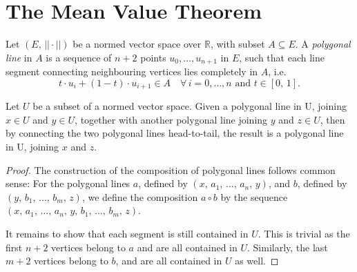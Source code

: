 %

\section{The Mean Value Theorem}

\begin{definition}
    \label{def:polygonalLine}
    \leanok
    Let $(E, \, ||\cdot||)$ be a normed vector space over $\mathbb{R}$, with subset $A \subseteq E$.
    A \emph{polygonal line} in $A$ is a sequence of $n + 2$ points $u_{0}, \dots, u_{n+1}$ in $E$,
    such that each line segment connecting neighbouring vertices lies completely in $A$, i.e.
    \[
        t \cdot u_{i} + (1 - t) \cdot u_{i + 1} \in A \quad \forall \, i = 0, \ldots, n
        \text{ and } t \in [0,\, 1].
    \]
\end{definition}

\begin{lemma}
    \label{lem:composition_of_polygonal_line}
    \leanok
    Let $U$ be a subset of a normed vector space.
    Given a polygonal line in U, joining $x \in U$ and $y \in U$, together with another polygonal line joining $y$ and $z \in U$,
    then by connecting the two polygonal lines head-to-tail, the result is a polygonal line in U, joining $x$ and $z$.
\end{lemma}
\begin{proof}
    \leanok
    The construction of the composition of polygonal lines follows common sense:
    For the polygonal lines $a$, defined by $(x,\, a_1,\, \dots,\, a_n,\,y)$,
    and $b$, defined by $(y,\, b_1,\, \dots,\, b_m,\, z)$,
    we define the composition $a \circ b$ by the sequence $(x,\,a_1,\,\dots,\, a_n,\,y,\,b_1,\,\dots,\,b_m,\,z)$.

    It remains to show that each segment is still contained in $U$.
    This is trivial as the first $n + 2$ vertices belong to $a$ and are all contained in $U$.
    Similarly, the last $m + 2$ vertices belong to $b$, and are all contained in $U$ as well.
\end{proof}


